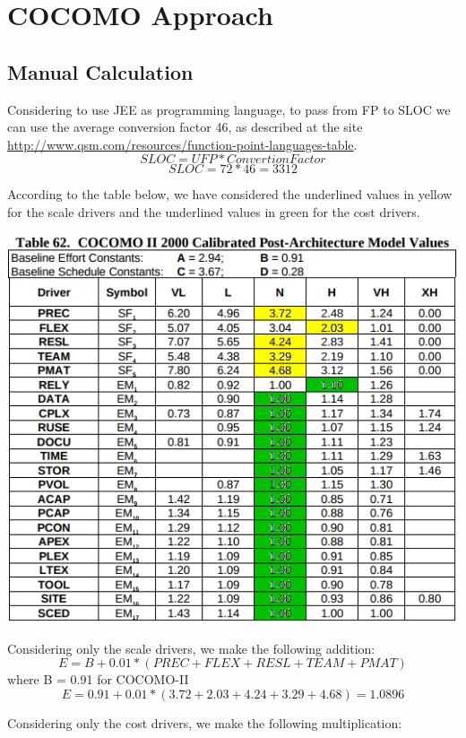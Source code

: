\section{COCOMO Approach}
\subsection{Manual Calculation}
	Considering to use JEE as programming language, to pass from FP to SLOC we can use the average conversion factor 46, as described at the site \newline \url{http://www.qsm.com/resources/function-point-languages-table}. 
	$$SLOC=UFP*ConvertionFactor$$
	$$SLOC=72*46=3312$$
	
	According to the table below, we have considered the underlined values in yellow for the scale drivers and the underlined values in green for the cost drivers.
	
	\begin{center}
			\includegraphics[width=1\textwidth]{./images/drivers.png}
	\end{center}
	\newpage
	\noindent Considering only the scale drivers, we make the following addition:
	$$E=B + 0.01*(PREC+FLEX+RESL+TEAM+PMAT)$$ where B = 0.91 for COCOMO-II
	$$E=0.91+0.01*(3.72+2.03+4.24+3.29+4.68)=1.0896$$
	
	
	\noindent Considering only the cost drivers, we make the following multiplication:

